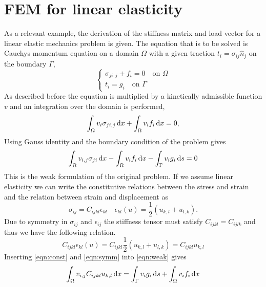 \documentclass[fem.tex]{subfiles}
\begin{document}
\section{FEM for linear elasticity}
As a relevant example, the derivation of the stiffness matrix and load vector for a linear elastic mechanics problem is given. The equation that is to be solved is Cauchys momentum equation on a domain $\Omega$ with a given traction $t_i = \sigma_{ij} \hat{n}_j$ on the boundary $\Gamma$,
\begin{equation} 
\left\{
\begin{array}{ll}
   \sigma_{ji,j} + f_i = 0 \quad \text{on } \Omega \\
   t_i = g_i \quad \text{on } \Gamma \end{array} \right.
    \label{eqn:cond}
\end{equation}
%
As described before the equation is multiplied by a kinetically admissible function $v$ and an integration over the domain is performed,
%
\begin{equation} 
  \int_\Omega  v_i\sigma_{ji,j} \, \mathrm{d} x + \int_\Omega v_i f_i \, \mathrm{d} x = 0, 
    \label{eqn:cond}
\end{equation}
%
Using Gauss identity and the boundary condition of the problem gives
%
\begin{equation} 
  \int_\Omega  v_{i,j} \sigma_{ji} \, \mathrm{d} x  - \int_\Omega v_i f_i \, \mathrm{d} x - \int_\Gamma v_i g_i \, \mathrm{d} s = 0
    \label{eqn:weak}
\end{equation}
%
 This is the weak formulation of the original problem. If we assume linear elasticity we can write the constitutive relations between the stress and strain and the relation between strain and displacement as
%
\begin{equation}
\label{eqn:const} 
\sigma_{ij} = C_{ijkl} \epsilon_{kl} \quad  \epsilon_{kl}(u) = \frac{1}{2} \left(u_{k,l} + u_{l,k}\right). 
\end{equation}
%
Due to symmetry in $\sigma_{ij}$ and $\epsilon_{ij}$ the stiffness tensor must satisfy $C_{ijkl} = C_{ijlk}$ and thus we have the following relation.
%
\begin{equation}
\label{eqn:symm}
 C_{ijkl}\epsilon_{kl} (u) = C_{ijkl}\frac{1}{2} \left(u_{k,l} + u_{l,k}\right) = C_{ijkl}u_{k,l} 
\end{equation}
%
Inserting \ref{eqn:const} and \ref{eqn:symm} into \ref{eqn:weak} gives
%
\begin{equation} 
  \int_\Omega  v_{i,j} C_{ijkl} u_{k,l} \, \mathrm{d} x = \int_\Gamma v_i g_i \, \mathrm{d} s + \int_\Omega v_i f_i \, \mathrm{d} x
    \label{eqn:weak_2}
\end{equation}
\end{document}
